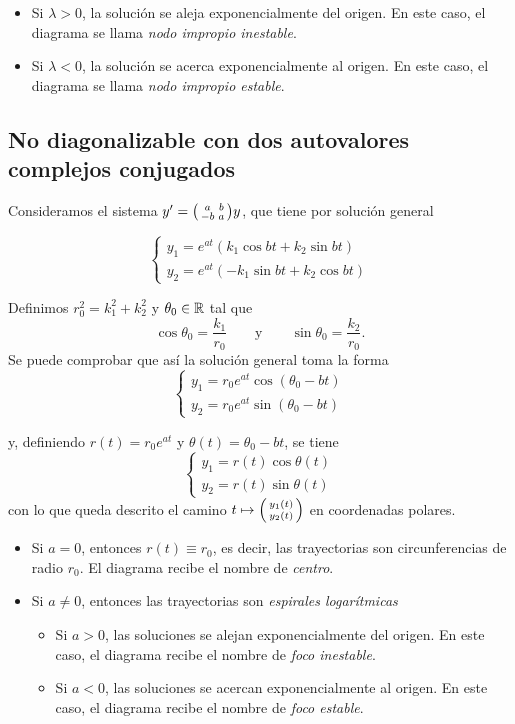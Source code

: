 \documentclass[../ecuaciones_diferenciales.tex]{subfiles}
\begin{document}
\begin{itemize}
	\item Si \(\lambda > 0\), la solución se aleja exponencialmente del origen. En
	      este caso, el diagrama se llama \emph{nodo impropio inestable}.
	\item Si \(\lambda < 0\), la solución se acerca exponencialmente al origen. En
	      este caso, el diagrama se llama \emph{nodo impropio estable}.
\end{itemize}

\subsection{No diagonalizable con dos autovalores complejos conjugados}
Consideramos el sistema \(y' = \smat{a & b \\ -b & a}y\), que tiene por solución
general

\[
	\begin{cases}
		y_1 = e^{at}(k_1 \cos bt + k_2 \sin bt) \\
		y_2 = e^{at}(-k_1 \sin bt + k_2 \cos bt)
	\end{cases}
\]

Definimos \(r_0^2 = k_1^2+k_2^2\) y \(\theta_0 \in \mathbb{R}\) tal que
\[\cos \theta_0 = \frac{k_1}{r_0} \qquad \text{y} \qquad \sin \theta_0 = \frac{k_2}{r_0}.\]
Se puede comprobar que así la solución general toma la forma
\[
	\begin{cases}
		y_1 = r_0e^{at} \cos (\theta_0 - bt) \\
		y_2 = r_0e^{at} \sin (\theta_0 - bt)
	\end{cases}
\]

y, definiendo \(r(t) = r_0e^{at}\) y \(\theta(t) = \theta_0 - bt\), se tiene
\[
	\begin{cases}
		y_1 = r(t) \cos \theta(t) \\
		y_2 = r(t) \sin \theta(t)
	\end{cases}
\]
con lo que queda descrito el camino \(t \mapsto \smat{y_1(t) \\ y_2(t)}\) en
coordenadas polares.

\begin{itemize}
	\item Si \(a = 0\), entonces \(r(t) \equiv r_0\), es decir, las trayectorias son
	      circunferencias de radio \(r_0\). El diagrama recibe el nombre de \emph{centro}.
	\item Si \(a \neq 0\), entonces las trayectorias son \emph{espirales logarítmicas}
	      \begin{itemize}
		      \item Si \(a > 0\), las soluciones se alejan exponencialmente del
		            origen. En este caso, el diagrama recibe el nombre de \emph{foco inestable}.
		      \item Si \(a < 0\), las soluciones se acercan exponencialmente al
		            origen. En este caso, el diagrama recibe el nombre de \emph{foco estable}.
	      \end{itemize}
\end{itemize}
\end{document}
